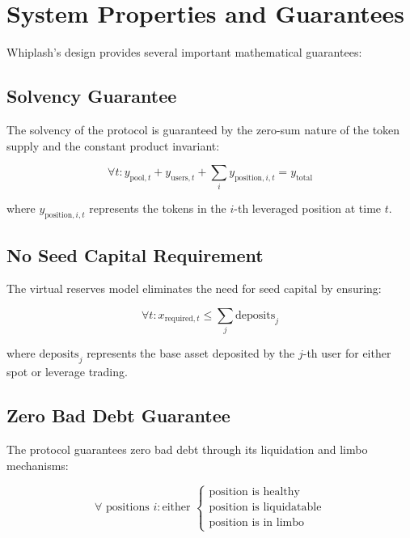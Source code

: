 \documentclass[11pt]{article}
\begin{document}
\section{System Properties and Guarantees}

Whiplash's design provides several important mathematical guarantees:

\subsection{Solvency Guarantee}

The solvency of the protocol is guaranteed by the zero-sum nature of the token supply and the constant product invariant:

\begin{equation}
\forall t: y_{\text{pool},t} + y_{\text{users},t} + \sum_{i} y_{\text{position},i,t} = y_{\text{total}}
\end{equation}

where $y_{\text{position},i,t}$ represents the tokens in the $i$-th leveraged position at time $t$.

\subsection{No Seed Capital Requirement}

The virtual reserves model eliminates the need for seed capital by ensuring:

\begin{equation}
\forall t: x_{\text{required},t} \leq \sum_{j} \text{deposits}_j
\end{equation}

where $\text{deposits}_j$ represents the base asset deposited by the $j$-th user for either spot or leverage trading.

\subsection{Zero Bad Debt Guarantee}

The protocol guarantees zero bad debt through its liquidation and limbo mechanisms:

\begin{equation}
\forall \text{ positions } i: \text{either } \begin{cases}
\text{position is healthy} \\
\text{position is liquidatable} \\
\text{position is in limbo}
\end{cases}
\end{equation}
\end{document}

